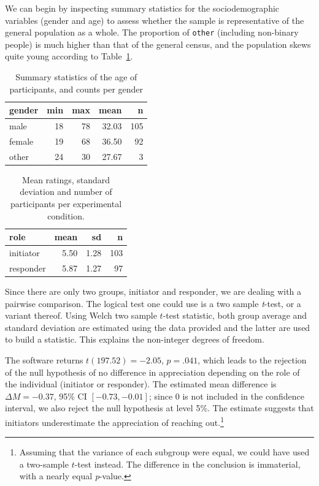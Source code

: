 \documentclass[
  11pt,
  letterpaper,
]{scrbook}
\theoremstyle{definition}
\theoremstyle{definition}
\theoremstyle{remark}
\begin{document}
We can begin by inspecting summary statistics for the sociodemographic
variables (gender and age) to assess whether the sample is
representative of the general population as a whole. The proportion of
\texttt{other} (including non-binary people) is much higher than that of
the general census, and the population skews quite young according to
Table~\ref{tbl-LRMMS1-summarystat-a}.

\begin{longtable}[t]{lrrrr}

\caption{\label{tbl-LRMMS1-summarystat-a}Summary statistics of the age
of participants, and counts per gender}

\tabularnewline

\toprule
gender & min & max & mean & n\\
\midrule
male & 18 & 78 & 32.03 & 105\\
female & 19 & 68 & 36.50 & 92\\
other & 24 & 30 & 27.67 & 3\\
\bottomrule

\end{longtable}

\begin{longtable}[t]{lrrr}

\caption{\label{tbl-LRMMS1-summarystat-b}Mean ratings, standard
deviation and number of participants per experimental condition.}

\tabularnewline

\toprule
role & mean & sd & n\\
\midrule
initiator & 5.50 & 1.28 & 103\\
responder & 5.87 & 1.27 & 97\\
\bottomrule

\end{longtable}

Since there are only two groups, initiator and responder, we are dealing
with a pairwise comparison. The logical test one could use is a two
sample \emph{t}-test, or a variant thereof. Using Welch two sample
\(t\)-test statistic, both group average and standard deviation are
estimated using the data provided and the latter are used to build a
statistic. This explains the non-integer degrees of freedom.

The software returns \(t(197.52) = -2.05\), \(p = .041\), which leads to
the rejection of the null hypothesis of no difference in appreciation
depending on the role of the individual (initiator or responder). The
estimated mean difference is \(\Delta M = -0.37\), 95\% CI
\([-0.73, -0.01]\); since \(0\) is not included in the confidence
interval, we also reject the null hypothesis at level 5\%. The estimate
suggests that initiators underestimate the appreciation of reaching
out.\footnote{Assuming that the variance of each subgroup were equal, we
  could have used a two-sample \(t\)-test instead. The difference in the
  conclusion is immaterial, with a nearly equal \emph{p}-value.}
\end{document}
